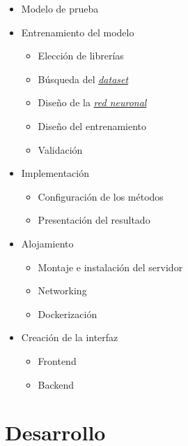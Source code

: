 \documentclass{article}
\begin{document}
\begin{itemize}
	\item Modelo de prueba
	\item Entrenamiento del modelo
	\begin{itemize}
    	\item Elección de librerías
    	\item Búsqueda del \hyperref[sec:terms]{\textit{dataset}\tec}
    	\item Diseño de la \hyperref[sec:terms]{\textit{red neuronal}\tec}
    	\item Diseño del entrenamiento
    	\item Validación
	\end{itemize}
   \item Implementación
	\begin{itemize}
    	\item Configuración de los métodos
    	\item Presentación del resultado
	\end{itemize}
   \item Alojamiento
	\begin{itemize}
    	\item Montaje e instalación del servidor
    	\item Networking
    	\item Dockerización
	\end{itemize}
	\item Creación de la interfaz
	\begin{itemize}
    	\item Frontend
    	\item Backend
	\end{itemize}
\end{itemize}


\section{Desarrollo}
\label{sec:Development}
\end{document}
